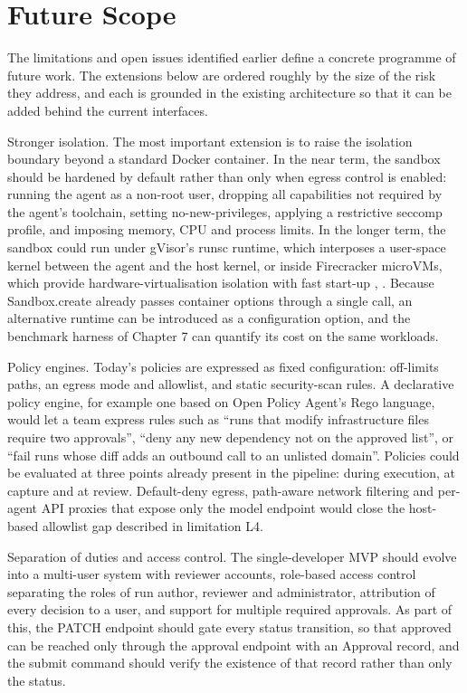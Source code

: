\documentclass[12pt,a4paper,oneside]{report}
\begin{document}
\clearpage

\chapter{Future Scope}\label{future-scope}

The limitations and open issues identified earlier define a concrete programme of future work. The extensions below are ordered roughly by the size of the risk they address, and each is grounded in the existing architecture so that it can be added behind the current interfaces.

Stronger isolation. The most important extension is to raise the isolation boundary beyond a standard Docker container. In the near term, the sandbox should be hardened by default rather than only when egress control is enabled: running the agent as a non-root user, dropping all capabilities not required by the agent's toolchain, setting no-new-privileges, applying a restrictive seccomp profile, and imposing memory, CPU and process limits. In the longer term, the sandbox could run under gVisor's runsc runtime, which interposes a user-space kernel between the agent and the host kernel, or inside Firecracker microVMs, which provide hardware-virtualisation isolation with fast start-up \cite{ref12}, \cite{ref13}. Because Sandbox.create already passes container options through a single call, an alternative runtime can be introduced as a configuration option, and the benchmark harness of Chapter 7 can quantify its cost on the same workloads.

Policy engines. Today's policies are expressed as fixed configuration: off-limits paths, an egress mode and allowlist, and static security-scan rules. A declarative policy engine, for example one based on Open Policy Agent's Rego language, would let a team express rules such as ``runs that modify infrastructure files require two approvals'', ``deny any new dependency not on the approved list'', or ``fail runs whose diff adds an outbound call to an unlisted domain''. Policies could be evaluated at three points already present in the pipeline: during execution, at capture and at review. Default-deny egress, path-aware network filtering and per-agent API proxies that expose only the model endpoint would close the host-based allowlist gap described in limitation L4.

Separation of duties and access control. The single-developer MVP should evolve into a multi-user system with reviewer accounts, role-based access control separating the roles of run author, reviewer and administrator, attribution of every decision to a user, and support for multiple required approvals. As part of this, the PATCH endpoint should gate every status transition, so that approved can be reached only through the approval endpoint with an Approval record, and the submit command should verify the existence of that record rather than only the status.
\end{document}
